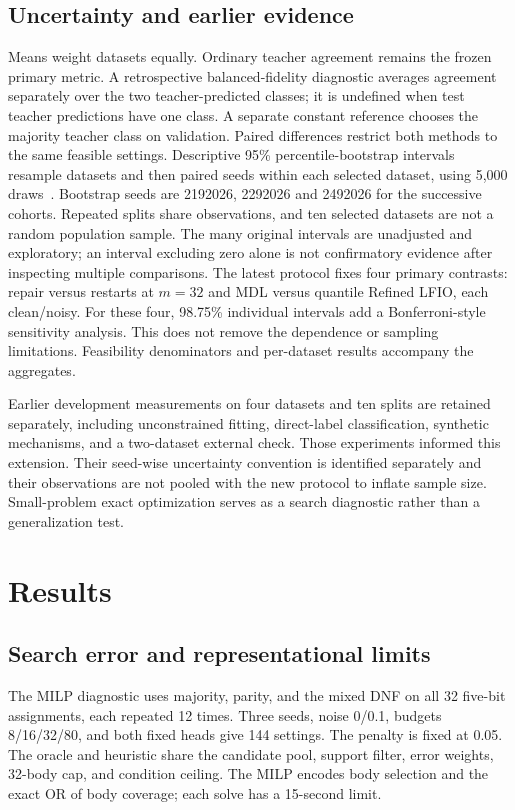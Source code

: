 \documentclass[a4paper,fleqn,review]{cas-sc}
\begin{document}
\subsection{Uncertainty and earlier evidence}
Means weight datasets equally. Ordinary teacher agreement remains the frozen primary metric. A retrospective balanced-fidelity diagnostic averages agreement separately over the two teacher-predicted classes; it is undefined when test teacher predictions have one class. A separate constant reference chooses the majority teacher class on validation. Paired differences restrict both methods to the same feasible settings. Descriptive 95\% percentile-bootstrap intervals resample datasets and then paired seeds within each selected dataset, using 5,000 draws~\citep{efron1979}. Bootstrap seeds are 2192026, 2292026 and 2492026 for the successive cohorts. Repeated splits share observations, and ten selected datasets are not a random population sample. The many original intervals are unadjusted and exploratory; an interval excluding zero alone is not confirmatory evidence after inspecting multiple comparisons. The latest protocol fixes four primary contrasts: repair versus restarts at $m=32$ and MDL versus quantile Refined LFIO, each clean/noisy. For these four, 98.75\% individual intervals add a Bonferroni-style sensitivity analysis. This does not remove the dependence or sampling limitations. Feasibility denominators and per-dataset results accompany the aggregates.

Earlier development measurements on four datasets and ten splits are retained separately, including unconstrained fitting, direct-label classification, synthetic mechanisms, and a two-dataset external check. Those experiments informed this extension. Their seed-wise uncertainty convention is identified separately and their observations are not pooled with the new protocol to inflate sample size. Small-problem exact optimization serves as a search diagnostic rather than a generalization test.

\section{Results}
\subsection{Search error and representational limits}\label{sec:diagnostics}

The MILP diagnostic uses majority, parity, and the mixed DNF on all 32 five-bit assignments, each repeated 12 times. Three seeds, noise 0/0.1, budgets 8/16/32/80, and both fixed heads give 144 settings. The penalty is fixed at 0.05. The oracle and heuristic share the candidate pool, support filter, error weights, 32-body cap, and condition ceiling. The MILP encodes body selection and the exact OR of body coverage; each solve has a 15-second limit.
\end{document}
